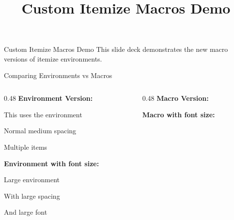 \documentclass[11pt,compress,t,notes=noshow, xcolor=table]{beamer}
\title{Custom Itemize Macros Demo}
\begin{document}

\begin{frame}{Custom Itemize Macros Demo}
  \vfill
  This slide deck demonstrates the new macro versions of itemize environments.
  \vfill
\end{frame}


\begin{frame}{Comparing Environments vs Macros}
  \begin{columns}[T]
    \begin{column}{0.48\textwidth}
      \textbf{Environment Version:}
      \begin{itemizeM}
        \item This uses the environment
        \item Normal medium spacing
        \item Multiple items
      \end{itemizeM}
      
      \vspace{0.5cm}
      \textbf{Environment with font size:}
      \begin{itemizeL}[large]
        \item Large environment
        \item With large spacing
        \item And large font
      \end{itemizeL}
    \end{column}
    
    \begin{column}{0.48\textwidth}
      \textbf{Macro Version:}
      
      \vspace{0.5cm}
      \textbf{Macro with font size:}
    \end{column}
  \end{columns}
\end{frame}
\end{document}
